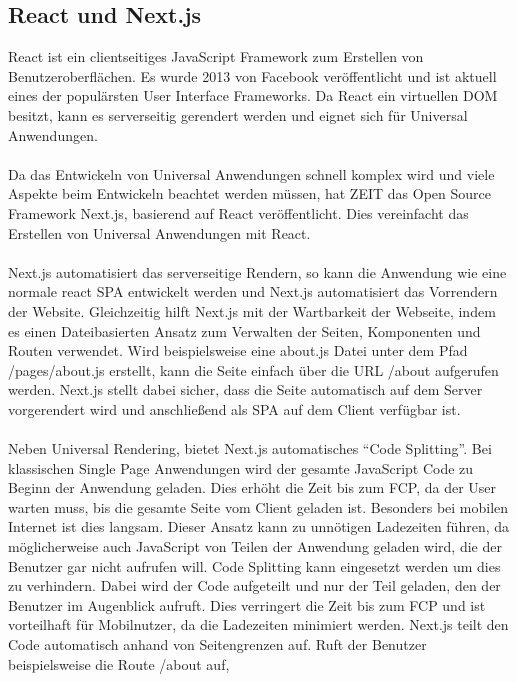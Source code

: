 \documentclass[runningheads]{llncs}
\begin{document}
\subsection{React und Next.js}
\label{subsec:React und Next.js}
React ist ein clientseitiges JavaScript Framework zum Erstellen von Benutzeroberflächen. 
Es wurde 2013 von Facebook veröffentlicht und ist aktuell eines der populärsten User Interface Frameworks. 
Da React ein virtuellen DOM besitzt, 
kann es serverseitig gerendert werden und eignet sich für Universal Anwendungen.
\\
\\
Da das Entwickeln von Universal Anwendungen schnell komplex wird und 
viele Aspekte beim Entwickeln beachtet werden müssen, 
hat ZEIT das Open Source Framework Next.js, 
basierend auf React veröffentlicht. 
Dies vereinfacht das Erstellen von Universal Anwendungen mit React.
\\
\\
Next.js automatisiert das serverseitige Rendern, 
so kann die Anwendung wie eine normale react SPA entwickelt werden und 
Next.js automatisiert das Vorrendern der Website. 
Gleichzeitig hilft Next.js mit der Wartbarkeit der Webseite, 
indem es einen Dateibasierten Ansatz zum Verwalten der Seiten, 
Komponenten und Routen verwendet. 
Wird beispielsweise eine about.js Datei unter dem Pfad /pages/about.js erstellt, 
kann die Seite einfach über die URL /about aufgerufen werden. 
Next.js stellt dabei sicher, 
dass die Seite automatisch auf dem Server vorgerendert wird und 
anschließend als SPA auf dem Client verfügbar ist. 
\\
\\
Neben Universal Rendering, bietet Next.js automatisches “Code Splitting”. 
Bei klassischen Single Page Anwendungen wird der gesamte JavaScript Code 
zu Beginn der Anwendung geladen. 
Dies erhöht die Zeit bis zum FCP, da der User warten muss, 
bis die gesamte Seite vom Client geladen ist. 
Besonders bei mobilen Internet ist dies langsam. 
Dieser Ansatz kann zu unnötigen Ladezeiten führen, 
da möglicherweise auch JavaScript von Teilen der Anwendung geladen wird, 
die der Benutzer gar nicht aufrufen will. 
Code Splitting kann eingesetzt werden um dies zu verhindern. 
Dabei wird der Code aufgeteilt und nur der Teil geladen, 
den der Benutzer im Augenblick aufruft. 
Dies verringert die Zeit bis zum FCP und ist vorteilhaft für Mobilnutzer, 
da die Ladezeiten minimiert werden.
Next.js teilt den Code automatisch anhand von Seitengrenzen auf. 
Ruft der Benutzer beispielsweise die Route /about auf, 
\end{document}
